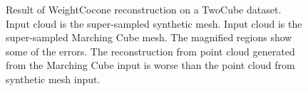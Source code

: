 \begin{figure}[t] 
	\centering 
	\caption{Result of WeightCocone reconstruction on a TwoCube dataset. \protect{} Input cloud is the super-sampled synthetic mesh. \protect{} Input cloud is the super-sampled Marching Cube mesh. The magnified regions show some of the errors. The reconstruction from point cloud generated from the Marching Cube input is worse than the  point cloud from synthetic mesh input. }
	\label{fig:cocone_compare_from_perfect_1}
	\vskip-0.2cm
\end{figure} 

